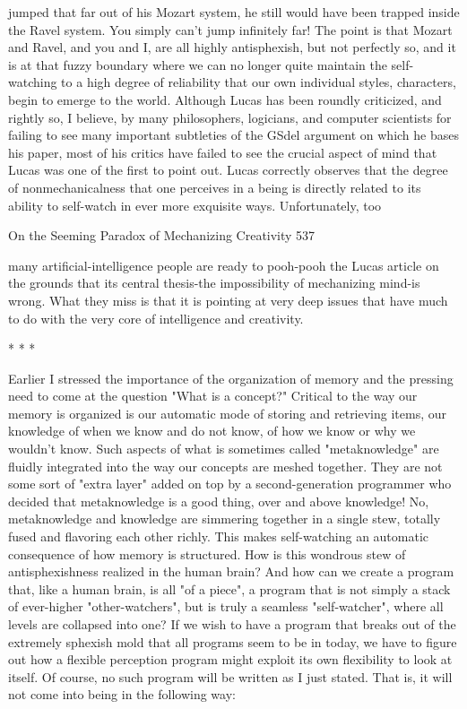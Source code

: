 jumped that far out of his Mozart system, he still would have been trapped inside the
Ravel system. You simply can't jump infinitely far!
        The point is that Mozart and Ravel, and you and I, are all highly antisphexish,
but not perfectly so, and it is at that fuzzy boundary where we can no longer quite
maintain the self-watching to a high degree of reliability that our own individual
styles, characters, begin to emerge to the world.
        Although Lucas has been roundly criticized, and rightly so, I believe, by many
philosophers, logicians, and computer scientists for failing to see many important
subtleties of the GSdel argument on which he bases his paper, most of his critics have
failed to see the crucial aspect of mind that Lucas was one of the first to point out.
Lucas correctly observes that the degree of nonmechanicalness that one perceives in a
being is directly related to its ability to self-watch in ever more exquisite ways.
Unfortunately, too




On the Seeming Paradox of Mechanizing Creativity                                     537

many artificial-intelligence people are ready to pooh-pooh the Lucas article on the
grounds that its central thesis-the impossibility of mechanizing mind-is wrong. What
they miss is that it is pointing at very deep issues that have much to do with the very
core of intelligence and creativity.

                                       *   *   *

        Earlier I stressed the importance of the organization of memory and the
pressing need to come at the question "What is a concept?" Critical to the way our
memory is organized is our automatic mode of storing and retrieving items, our
knowledge of when we know and do not know, of how we know or why we wouldn't
know. Such aspects of what is sometimes called "metaknowledge" are fluidly
integrated into the way our concepts are meshed together. They are not some sort of
"extra layer" added on top by a second-generation programmer who decided that
metaknowledge is a good thing, over and above knowledge! No, metaknowledge and
knowledge are simmering together in a single stew, totally fused and flavoring each
other richly. This makes self-watching an automatic consequence of how memory is
structured. How is this wondrous stew of antisphexishness realized in the human
brain?
        And how can we create a program that, like a human brain, is all "of a piece",
a program that is not simply a stack of ever-higher "other-watchers", but is truly a
seamless "self-watcher", where all levels are collapsed into one? If we wish to have a
program that breaks out of the extremely sphexish mold that all programs seem to be
in today, we have to figure out how a flexible perception program might exploit its
own flexibility to look at itself. Of course, no such program will be written as I just
stated. That is, it will not come into being in the following way:

